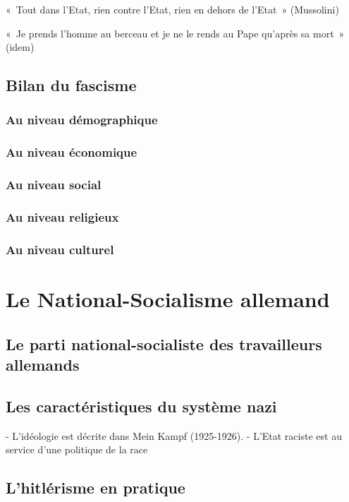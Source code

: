 \documentclass[12pt]{report}
\begin{document}
«~Tout dans l’Etat, rien contre l’Etat, rien en dehors de l’Etat~» (Mussolini)

«~Je prends l’homme au berceau et je ne le rends au Pape qu’après sa mort~» (idem)

\subsection{Bilan du fascisme}

\subsubsection{Au niveau démographique}

\subsubsection{Au niveau économique}

\subsubsection{Au niveau social}

\subsubsection{Au niveau religieux}

\subsubsection{Au niveau culturel}

\section{Le National-Socialisme allemand}

\subsection{Le parti national-socialiste des travailleurs allemands}

\subsection{Les caractéristiques du système nazi}

- L’idéologie est décrite dans Mein Kampf (1925-1926).
- L’Etat raciste est au service d’une politique de la race

\subsection{L'hitlérisme en pratique}
\end{document}
